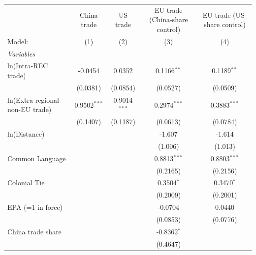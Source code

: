 
\begingroup
\centering
\begin{tabular}{lcccc}
   \tabularnewline \midrule \midrule
                                   & China trade    & US trade       & EU trade (China-share control) & EU trade (US-share control) \\   
   Model:                          & (1)            & (2)            & (3)                            & (4)\\  
   \midrule
   \emph{Variables}\\
   ln(Intra-REC trade)             & -0.0454        & 0.0352         & 0.1166$^{**}$                  & 0.1189$^{**}$\\   
                                   & (0.0381)       & (0.0854)       & (0.0527)                       & (0.0509)\\   
   ln(Extra-regional non-EU trade) & 0.9502$^{***}$ & 0.9014$^{***}$ & 0.2974$^{***}$                 & 0.3883$^{***}$\\   
                                   & (0.1407)       & (0.1187)       & (0.0613)                       & (0.0784)\\   
   ln(Distance)                    &                &                & -1.607                         & -1.614\\   
                                   &                &                & (1.006)                        & (1.013)\\   
   Common Language                 &                &                & 0.8813$^{***}$                 & 0.8803$^{***}$\\   
                                   &                &                & (0.2165)                       & (0.2156)\\   
   Colonial Tie                    &                &                & 0.3504$^{*}$                   & 0.3470$^{*}$\\   
                                   &                &                & (0.2009)                       & (0.2001)\\   
   EPA (=1 in force)               &                &                & -0.0704                        & 0.0440\\   
                                   &                &                & (0.0853)                       & (0.0776)\\   
   China trade share               &                &                & -0.8362$^{*}$                  &   \\   
                                   &                &                & (0.4647)                       &   \\   

\end{tabular}
